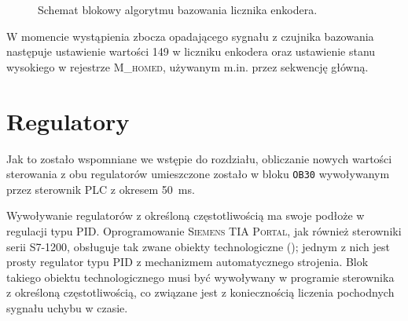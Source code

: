 \begin{figure}[ht]
    \centering
    
    
    \caption{Schemat blokowy algorytmu bazowania licznika enkodera.}
    \label{fig:schemat_bazowania}
\end{figure}

W momencie wystąpienia zbocza opadającego sygnału z czujnika bazowania następuje ustawienie wartości \num{149} w liczniku enkodera oraz ustawienie stanu wysokiego w rejestrze \textsc{M\_homed}, używanym m.in. przez sekwencję główną.

\section{Regulatory}
\label{sec:ch7_regulatory}

Jak to zostało wspomniane we wstępie do rozdziału, obliczanie nowych wartości sterowania z obu regulatorów umieszczone zostało w bloku \texttt{OB30} wywoływanym przez sterownik PLC z okresem \SI{50}{\milli\second}.

Wywoływanie regulatorów z określoną częstotliwością ma swoje podłoże w regulacji typu PID. Oprogramowanie \textsc{Siemens TIA Portal}, jak również sterowniki serii S7-1200, obsługuje tak zwane obiekty technologiczne (\cite{S7MANUAL}\cite{SCL_S71200_S71500}); jednym z nich jest prosty regulator typu PID z mechanizmem automatycznego strojenia. Blok takiego obiektu technologicznego musi być wywoływany w programie sterownika z określoną częstotliwością, co związane jest z koniecznością liczenia pochodnych sygnału uchybu w czasie.

